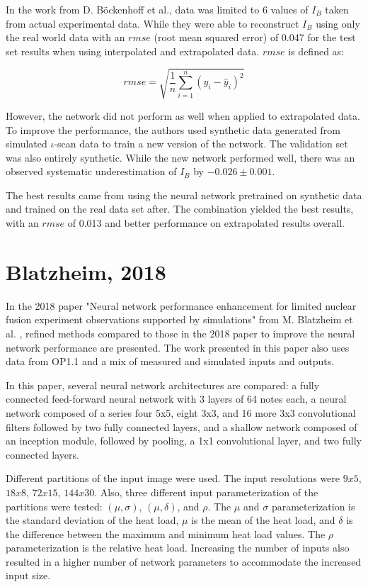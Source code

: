 In the work from D. Böckenhoff et al., data was limited to 6 values of $I_B$ taken from actual experimental data. While they were able to reconstruct $I_B$ using only the real world data with an $rmse$ (root mean squared error) of 0.047 for the test set results when using interpolated and extrapolated data. $rmse$ is defined as:

\begin{equation}
    rmse = \sqrt{\frac{1}{n}\sum_{i=1}^{n}(y_i - \hat{y}_i)^2}
\end{equation}

However, the network did not perform as well when applied to extrapolated data. To improve the performance, the authors used synthetic data generated from simulated $\iota$-scan data to train a new version of the network. The validation set was also entirely synthetic. While the new network performed well, there was an observed systematic underestimation of $I_B$ by $-0.026 \pm 0.001$.

The best results came from using the neural network pretrained on synthetic data and trained on the real data set after. The combination yielded the best results, with an $rmse$ of 0.013 and better performance on extrapolated results overall.

\section{Blatzheim, 2018}
In the 2018 paper "Neural network performance enhancement for limited nuclear fusion experiment observations supported by simulations" from M. Blatzheim et al. \cite{Blatzheim_2018}, refined methods compared to those in the 2018 paper to improve the neural network performance are presented. The work presented in this paper also uses data from OP1.1 and a mix of measured and simulated inputs and outputs.

In this paper, several neural network architectures are compared: a fully connected feed-forward neural network with 3 layers of 64 notes each, a neural network composed of a series four 5x5, eight 3x3, and 16 more 3x3 convolutional filters followed by two fully connected layers, and a shallow network composed of an inception module, followed by pooling, a 1x1 convolutional layer, and two fully connected layers.

Different partitions of the input image were used. The input resolutions were $9x5$, $18x8$, $72x15$, $144x30$. Also, three different input parameterization of the partitions were tested: $(\mu, \sigma)$, $(\mu, \delta)$, and $\rho$. The $\mu$ and $\sigma$ parameterization is the standard deviation of the heat load, $\mu$ is the mean of the heat load, and $\delta$ is the difference between the maximum and minimum heat load values. The $\rho$ parameterization is the relative heat load. Increasing the number of inputs also resulted in a higher number of network parameters to accommodate the increased input size.


